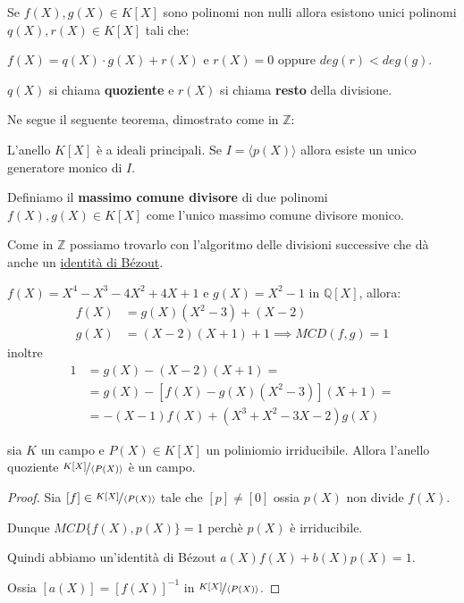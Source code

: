 \documentclass[../main.tex]{subfiles}
\begin{document}
Se $f(X), g(X) \in K[X]$ sono polinomi non nulli allora esistono unici polinomi $q(X), r(X) \in K[X]$ tali che:

$f(X) = q(X) \cdot g(X) + r(X)$ e $r(X) = 0$ oppure $deg(r) < deg(g)$.

$q(X)$ si chiama \textbf{quoziente} e $r(X)$ si chiama \textbf{resto} della divisione.

Ne segue il seguente teorema, dimostrato come in $\mathbb{Z}$:
\begin{theorem}
    L'anello $K[X]$ è a ideali principali. Se $I = \langle p(X)\rangle$ allora esiste un unico generatore monico di $I$.
\end{theorem}

\begin{definition}
    Definiamo il \textbf{massimo comune divisore} di due polinomi $f(X), g(X) \in K[X]$ come l'unico massimo comune divisore monico.
\end{definition}

Come in $\mathbb{Z}$ possiamo trovarlo con l'algoritmo delle divisioni successive che dà anche un \underline{identità di Bézout}.

\begin{example}
    $f(X) = X^4 - X^3 -4X^2 + 4X + 1$ e $g(X) = X^2 - 1$ in $\mathbb{Q}[X]$, allora:
    \begin{align*}
        f(X) & = g(X)(X^2 - 3) + (X - 2)                 \\
        g(X) & = (X - 2)(X + 1) +1 \implies MCD(f,g) = 1
    \end{align*}
    inoltre
    \begin{align*}
        1 & = g(X) - (X - 2)(X + 1) =                \\
          & = g(X) - [f(X) - g(X)(X^2 - 3)](X + 1) = \\
          & = -(X - 1)f(X) + (X^3 + X^2 - 3X -2)g(X)
    \end{align*}
\end{example}

\begin{proposition} sia $K$ un campo e $P(X) \in K[X]$ un poliniomio irriducibile. Allora l'anello quoziente $\nicefrac{K[X]}{\langle P(X)\rangle}$ è un campo.
\end{proposition}
\begin{proof}
    Sia $[f] \in \nicefrac{K[X]}{\langle P(X)\rangle}$ tale che $[p] \neq [0]$ ossia $p(X)$ non divide $f(X)$.

    Dunque $MCD\{f(X),p(X)\} = 1$ perchè $p(X)$ è irriducibile.

    Quindi abbiamo un'identità di Bézout $a(X)f(X) + b(X)p(X) = 1$.

    Ossia $[a(X)] = [f(X)]^{-1}$ in $\nicefrac{K[X]}{\langle P(X)\rangle}$.
\end{proof}
\end{document}
